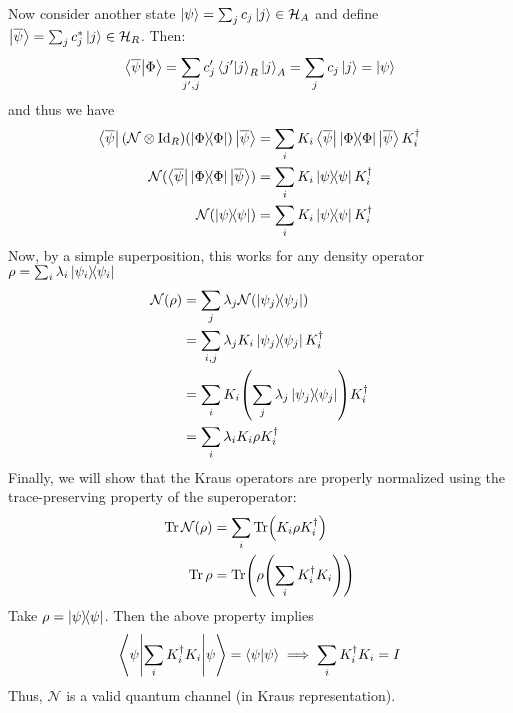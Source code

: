 \begin{theorem}
    Now consider another state $\ket{\psi} = \sum_j c_j \ket{j} \in \operatorname{\mathcal{H}}_A$ and
    define $\ket{\overline{\psi}} = \sum_j c_j^* \ket{j} \in \operatorname{\mathcal{H}}_R$. Then:
    \[ \bra{\overline{\psi}}\ket{\Phi} = \sum_{j', j} c_j' \braket{j'}{j}_R \ket{j}_A = \sum_j c_j \ket{j} = \ket{\psi} \]
    and thus we have
    \begin{align*}
        \bra{\overline{\psi}} \qty(\mathcal{N} \otimes \textrm{Id}_R)\qty(\ketbra{\Phi}) \ket{\overline{\psi}} &= \sum_i K_i \bra{\overline{\psi}} \ketbra{\Phi} \ket{\overline{\psi}} K_i^{\dagger} \\
        \mathcal{N}( \bra{\overline{\psi}} \ketbra{\Phi}  \ket{\overline{\psi}}) &= \sum_i K_i \ketbra{\psi} K_i^{\dagger} \\
        \mathcal{N}(\ketbra{\psi}) &= \sum_i K_i \ketbra{\psi} K_i^{\dagger}
    \end{align*}
    Now, by a simple superposition, this works for any density operator $\rho = \sum_i \lambda_i \ketbra{\psi_i}$
    \begin{align*}
        \mathcal{N}(\rho) &= \sum_j \lambda_j \mathcal{N}(\ketbra{\psi_j}) \\
        &= \sum_{i, j} \lambda_j K_i \ketbra{\psi_j} K_i^{\dagger} \\
        &= \sum_{i} K_i \qty(\sum_{j} \lambda_j\ketbra{\psi_j}) K_i^{\dagger} \\
        &= \sum_i \lambda_i K_i \rho K_i^{\dagger}
    \end{align*}
    Finally, we will show that the Kraus operators are properly normalized using the trace-preserving property of
    the superoperator:
    \begin{align*}
        \Tr \mathcal{N}(\rho) &= \sum_i \Tr(K_i \rho K_i^{\dagger}) \\
        \Tr \rho &= \Tr(\rho \qty(\sum_i K_i^{\dagger} K_i))
    \end{align*}
    Take $\rho = \ketbra{\psi}$. Then the above property implies
    \[ \mel**{\psi}{\sum_i K_i^{\dagger} K_i}{\psi} = \braket{\psi} \implies \sum_i K_i^{\dagger} K_i = I \]
    Thus, $\mathcal{N}$ is a valid quantum channel (in Kraus representation).
\end{theorem}

